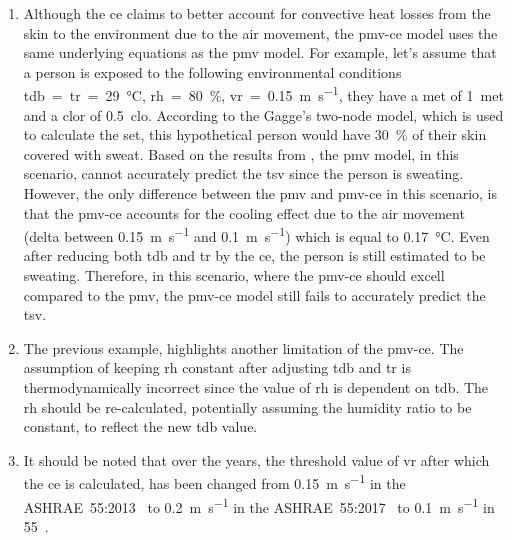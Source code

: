 \begin{enumerate}
    \item Although the \ac{ce} claims to better account for convective heat losses from the skin to the environment due to the air movement, the \ac{pmv-ce} model uses the same underlying equations as the \ac{pmv} model.
    For example, let's assume that a person is exposed to the following environmental conditions \ac{tdb}~=~\ac{tr}~=~\qty{29}{\celsius}, \ac{rh}~=~\qty{80}{\percent}, \ac{vr}~=~\qty{0.15}{\m\per\s}, they have a \ac{met} of \qty{1}{met} and a \ac{clor} of \qty{0.5}{clo}.
    According to the Gagge's two-node model, which is used to calculate the \ac{set}, this hypothetical person would have \qty{30}{\percent} of their skin covered with sweat.
    Based on the results from , the \ac{pmv} model, in this scenario, cannot accurately predict the \ac{tsv} since the person is sweating.
    However, the only difference between the \ac{pmv} and \ac{pmv-ce} in this scenario, is that the \ac{pmv-ce} accounts for the cooling effect due to the air movement (delta between \qty{0.15}{\m\per\s} and \qty{0.1}{\m\per\s}) which is equal to \qty{.17}{\celsius}.
    Even after reducing both \ac{tdb} and \ac{tr} by the \ac{ce}, the person is still estimated to be sweating.
    Therefore, in this scenario, where the \ac{pmv-ce} should excell compared to the \ac{pmv}, the \ac{pmv-ce} model still fails to accurately predict the \ac{tsv}.
    \item The previous example, highlights another limitation of the \ac{pmv-ce}.
    The assumption of keeping \ac{rh} constant after adjusting \ac{tdb} and \ac{tr} is thermodynamically incorrect since the value of \ac{rh} is dependent on \ac{tdb}.
    The \ac{rh} should be re-calculated, potentially assuming the humidity ratio to be constant, to reflect the new \ac{tdb} value.
    \item It should be noted that over the years, the threshold value of \ac{vr} after which the \ac{ce} is calculated, has been changed from \qty{0.15}{\m\per\s} in the ASHRAE~55:2013~\cite{ASHRAE552013} to \qty{0.2}{\m\per\s} in the ASHRAE~55:2017~\cite{ASHRAE552017, arens_moving_2009} to \qty{0.1}{\m\per\s} in \gls{55}~\cite{ashrae552023}.

\end{enumerate}
